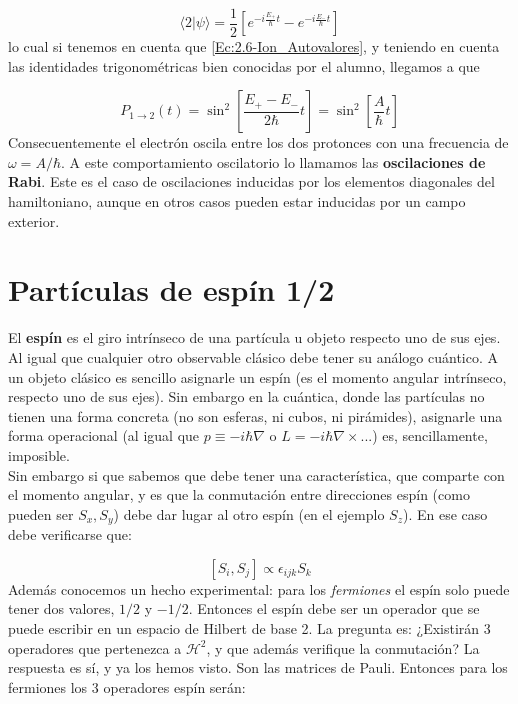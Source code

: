 \documentclass[12pt]{book}
\numberwithin{equation}{chapter}
\numberwithin{figure}{chapter}
\newcommand{\ccorchetes}[1]{\left[ #1  \right]}
\begin{document}
\begin{equation}
\langle 2 | \psi \rangle = \dfrac{1}{2} \ccorchetes{ e^{- i  \frac{E_+}{\hbar} t } - e^{- i \frac{E_-}{\hbar} t } }
\end{equation}
lo cual si tenemos en cuenta que \ref{Ec:2.6-Ion_Autovalores}, y teniendo en cuenta las identidades trigonométricas bien conocidas por el alumno, llegamos a que

\begin{equation}
P_{1 \rightarrow 2}  (t) = \sin^2 \ccorchetes{\frac{E_+ - E_-}{2 \hbar} t} = \sin^2 \ccorchetes{\frac{A}{\hbar} t} 
\end{equation}
Consecuentemente el electrón oscila entre los dos protonces con una frecuencia de $\omega = A / \hbar$. A este comportamiento oscilatorio lo llamamos las \textbf{oscilaciones de Rabi}. Este es el caso de oscilaciones inducidas por los elementos diagonales del hamiltoniano, aunque en otros casos pueden estar inducidas por un campo exterior.

 \hrulefill 

\section{Partículas de espín 1/2}

El \textbf{espín} es el giro intrínseco de una partícula u objeto respecto uno de sus ejes. Al igual que cualquier otro observable clásico debe tener su análogo cuántico. A un objeto clásico es sencillo asignarle un espín (es el momento angular intrínseco, respecto uno de sus ejes). Sin embargo en la cuántica, donde las partículas no tienen una forma concreta (no son esferas, ni cubos, ni pirámides), asignarle una forma  operacional (al igual que $p \equiv - i \hbar \nabla$ o $L = - i \hbar \nabla \times$...) es, sencillamente, imposible. \\

Sin embargo si que sabemos que debe tener una característica, que comparte con el momento angular, y es que la conmutación entre direcciones espín (como pueden ser $S_x,S_y$) debe dar lugar al otro espín (en el ejemplo $S_z$). En ese caso debe verificarse que:

$$[S_i, S_j] \propto \epsilon_{ijk} S_k $$
Además conocemos un hecho experimental: para los \textit{fermiones} el espín solo puede tener dos valores, $1/2$ y $-1/2$. Entonces el espín debe ser un operador que se puede escribir en un espacio de Hilbert de base 2. La pregunta es: ¿Existirán 3 operadores que pertenezca a $\mathcal{H}^2$, y que además verifique la conmutación? La respuesta es sí, y ya los hemos visto. Son las matrices de Pauli. Entonces para los fermiones los 3 operadores espín serán:
\end{document}
